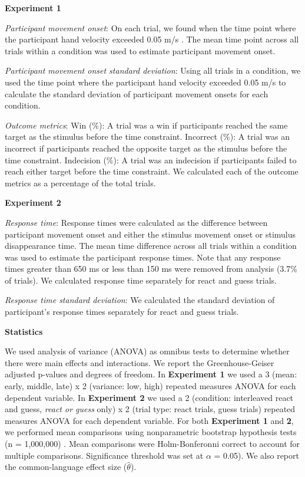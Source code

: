 \documentclass[12pt]{article}
\newcommand\boldblue[1]{\textcolor{mydarkblue}{\textbf{#1}}}
\begin{document}
\noindent \boldblue{Experiment 1}

\noindent \emph{Participant movement onset}: On each trial, we found when the time point where the participant hand velocity exceeded 0.05 m/s \autocite{gribbleRoleCocontractionArm2003,calaloSensorimotorSystemModulates2023}. The mean time point across all trials within a condition was used to estimate participant movement onset.

\noindent \emph{Participant movement onset standard deviation}: Using all trials in a condition, we used the time point where the participant hand velocity exceeded 0.05 m/s to calculate the standard deviation of participant movement onsets for each condition.

\noindent \emph{Outcome metrics}: Win (\%): A trial was a win if participants reached the same target as the stimulus before the time constraint. Incorrect (\%): A trial was an incorrect if participants reached the opposite target as the stimulus before the time constraint. Indecision (\%): A trial was an indecision if participants failed to reach either target before the time constraint. We calculated each of the outcome metrics as a percentage of the total trials.

\noindent \boldblue{ Experiment 2}

\noindent \emph{Response time}: Response times were calculated as the difference between participant movement onset and either the stimulus movement onset or stimulus disappearance time. The mean time difference across all trials within a condition was used to estimate the participant response times. Note that any response times greater than 650 ms or less than 150 ms were removed from analysis (3.7\% of trials). We calculated response time separately for react and guess trials.

\noindent \emph{Response time standard deviation}: We calculated the standard deviation of participant’s response times separately for react and guess trials.

\noindent\boldblue{\large\textcolor{mydarkblue}{Statistics}}

\noindent{\boldblue{Experiment 1 and 2}}

\noindent We used analysis of variance (ANOVA) as omnibus tests to determine whether there were main effects and interactions. We report the Greenhouse-Geiser adjusted p-values and degrees of freedom. In \boldblue{Experiment 1} we used a 3 (mean: early, middle, late) x 2 (variance: low, high) repeated measures ANOVA for each dependent variable. In \boldblue{Experiment 2} we used a 2 (condition: interleaved react and guess, \emph{react or guess} only) x 2 (trial type: react trials, guess trials) repeated measures ANOVA for each dependent variable. For both \boldblue{Experiment 1} and \boldblue{2}, we performed mean comparisons using nonparametric bootstrap hypothesis tests (n = 1,000,000) \autocite*{hesterbergBootstrap2011,cashabackDissociatingErrorbasedReinforcementbased2017,cashabackGradientReinforcementLandscape2019a}. Mean comparisons were Holm-Bonferonni correct to account for multiple comparisons. Significance threshold was set at $\alpha$ = 0.05). We also report the common-language effect size ($\hat{\theta}$).
\end{document}
